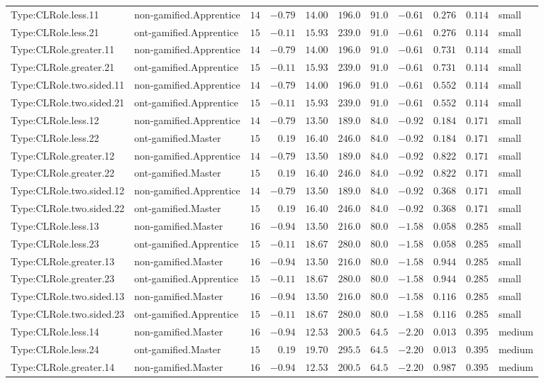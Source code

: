 \documentclass[6pt,a4paper]{article}
\begin{document}
{\begin{longtable}{llrrrrrrrrl}
Type:CLRole.less.11&non-gamified.Apprentice&$14$&$-0.79$&$14.00$&$ 196.0$&$ 91.0$&$-0.61$&$0.276$&$0.114$&small\tabularnewline
Type:CLRole.less.21&ont-gamified.Apprentice&$15$&$-0.11$&$15.93$&$ 239.0$&$ 91.0$&$-0.61$&$0.276$&$0.114$&small\tabularnewline
Type:CLRole.greater.11&non-gamified.Apprentice&$14$&$-0.79$&$14.00$&$ 196.0$&$ 91.0$&$-0.61$&$0.731$&$0.114$&small\tabularnewline
Type:CLRole.greater.21&ont-gamified.Apprentice&$15$&$-0.11$&$15.93$&$ 239.0$&$ 91.0$&$-0.61$&$0.731$&$0.114$&small\tabularnewline
Type:CLRole.two.sided.11&non-gamified.Apprentice&$14$&$-0.79$&$14.00$&$ 196.0$&$ 91.0$&$-0.61$&$0.552$&$0.114$&small\tabularnewline
Type:CLRole.two.sided.21&ont-gamified.Apprentice&$15$&$-0.11$&$15.93$&$ 239.0$&$ 91.0$&$-0.61$&$0.552$&$0.114$&small\tabularnewline
Type:CLRole.less.12&non-gamified.Apprentice&$14$&$-0.79$&$13.50$&$ 189.0$&$ 84.0$&$-0.92$&$0.184$&$0.171$&small\tabularnewline
Type:CLRole.less.22&ont-gamified.Master&$15$&$ 0.19$&$16.40$&$ 246.0$&$ 84.0$&$-0.92$&$0.184$&$0.171$&small\tabularnewline
Type:CLRole.greater.12&non-gamified.Apprentice&$14$&$-0.79$&$13.50$&$ 189.0$&$ 84.0$&$-0.92$&$0.822$&$0.171$&small\tabularnewline
Type:CLRole.greater.22&ont-gamified.Master&$15$&$ 0.19$&$16.40$&$ 246.0$&$ 84.0$&$-0.92$&$0.822$&$0.171$&small\tabularnewline
Type:CLRole.two.sided.12&non-gamified.Apprentice&$14$&$-0.79$&$13.50$&$ 189.0$&$ 84.0$&$-0.92$&$0.368$&$0.171$&small\tabularnewline
Type:CLRole.two.sided.22&ont-gamified.Master&$15$&$ 0.19$&$16.40$&$ 246.0$&$ 84.0$&$-0.92$&$0.368$&$0.171$&small\tabularnewline
Type:CLRole.less.13&non-gamified.Master&$16$&$-0.94$&$13.50$&$ 216.0$&$ 80.0$&$-1.58$&$0.058$&$0.285$&small\tabularnewline
Type:CLRole.less.23&ont-gamified.Apprentice&$15$&$-0.11$&$18.67$&$ 280.0$&$ 80.0$&$-1.58$&$0.058$&$0.285$&small\tabularnewline
Type:CLRole.greater.13&non-gamified.Master&$16$&$-0.94$&$13.50$&$ 216.0$&$ 80.0$&$-1.58$&$0.944$&$0.285$&small\tabularnewline
Type:CLRole.greater.23&ont-gamified.Apprentice&$15$&$-0.11$&$18.67$&$ 280.0$&$ 80.0$&$-1.58$&$0.944$&$0.285$&small\tabularnewline
Type:CLRole.two.sided.13&non-gamified.Master&$16$&$-0.94$&$13.50$&$ 216.0$&$ 80.0$&$-1.58$&$0.116$&$0.285$&small\tabularnewline
Type:CLRole.two.sided.23&ont-gamified.Apprentice&$15$&$-0.11$&$18.67$&$ 280.0$&$ 80.0$&$-1.58$&$0.116$&$0.285$&small\tabularnewline
Type:CLRole.less.14&non-gamified.Master&$16$&$-0.94$&$12.53$&$ 200.5$&$ 64.5$&$-2.20$&$0.013$&$0.395$&medium\tabularnewline
Type:CLRole.less.24&ont-gamified.Master&$15$&$ 0.19$&$19.70$&$ 295.5$&$ 64.5$&$-2.20$&$0.013$&$0.395$&medium\tabularnewline
Type:CLRole.greater.14&non-gamified.Master&$16$&$-0.94$&$12.53$&$ 200.5$&$ 64.5$&$-2.20$&$0.987$&$0.395$&medium\tabularnewline

\end{longtable}}
\end{document}
